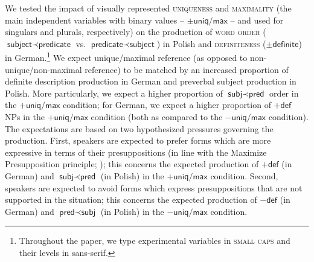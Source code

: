 \documentclass[output=paper]{langscibook}
\begin{document}
We tested the impact of visually represented \textsc{uniqueness} and \textsc{maximality} (the main independent variables with binary values -- $\pm\textsf{uniq/max}$ -- and used for singulars and plurals, respectively) on the production of \textsc{word order} ($\textsf{subject}\prec\textsf{predicate}$ vs. $\textsf{predicate}\prec\textsf{subject}$) in Polish and \textsc{definiteness} ($\pm\textsf{definite}$) in German.\footnote{Throughout the paper, we type experimental variables in \textsc{small caps} and their levels in \textsf{sans-serif}.} We expect unique/maximal reference (as opposed to non-unique/non-maximal reference) to be matched by an increased proportion of definite description production in German and preverbal subject production in Polish. More particularly, we expect a higher proportion of $\textsf{subj}\prec\textsf{pred}$ order in the $+\textsf{uniq/max}$ condition; for German, we expect a higher proportion of $+\textsf{def}$ NPs in the $+\textsf{uniq/max}$ condition (both as compared to the $-\textsf{uniq/max}$ condition). The expectations are based on two hypothesized pressures governing the production. First, speakers are expected to prefer forms which are more expressive in terms of their presuppositions (in line with the Maximize Presupposition principle; \citealt{Heim1991}); this concerns the expected production of $+\textsf{def}$ (in German) and $\textsf{subj}\prec\textsf{pred}$ (in Polish) in the $+\textsf{uniq/max}$ condition. Second, speakers are expected to avoid forms which express presuppositions that are not supported in the situation; this concerns the expected production of $-\textsf{def}$ (in German) and $\textsf{pred}\prec\textsf{subj}$ (in Polish) in the $-\textsf{uniq/max}$ condition.
\end{document}
